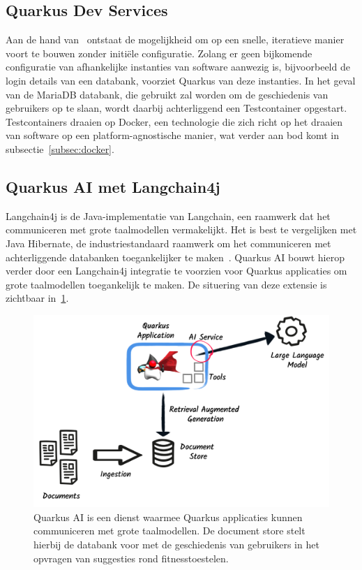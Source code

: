 \subsection{Quarkus Dev Services}
\label{subsec:quarkus-dev-services}
Aan de hand van~\autocite{Quarkus} ontstaat de mogelijkheid om op een snelle, iteratieve manier voort te bouwen zonder initiële configuratie.
Zolang er geen bijkomende configuratie van afhankelijke instanties van software aanwezig is, bijvoorbeeld de login details van een databank, voorziet Quarkus van deze instanties.
In het geval van de MariaDB databank, die gebruikt zal worden om de geschiedenis van gebruikers op te slaan, wordt daarbij achterliggend een Testcontainer opgestart.
Testcontainers draaien op Docker, een technologie die zich richt op het draaien van software op een platform-agnostische manier, wat verder aan bod komt in subsectie~\ref{subsec:docker}.

\subsection{Quarkus AI met Langchain4j}
\label{subsec:quarkus-ai-met-langchain4j}
Langchain4j is de Java-implementatie van Langchain, een raamwerk dat het communiceren met grote taalmodellen vermakelijkt.
Het is best te vergelijken met Java Hibernate, de industriestandaard raamwerk om het communiceren met achterliggende databanken toegankelijker te maken~\autocite{Langchain4j}.
Quarkus AI bouwt hierop verder door een Langchain4j integratie te voorzien voor Quarkus applicaties om grote taalmodellen toegankelijk te maken.
De situering van deze extensie is zichtbaar in~\ref{fig:quarkus-ai}.

\begin{figure}[H]
    \begin{center}
        \includegraphics[scale=0.45]{images/quarkus-ai-visualisation}
        \caption{Quarkus AI is een dienst waarmee Quarkus applicaties kunnen communiceren met grote taalmodellen. De document store stelt hierbij de databank voor met de geschiedenis van gebruikers in het opvragen van suggesties rond fitnesstoestelen.~\autocite{Lowe2004}}
        \label{fig:quarkus-ai}
    \end{center}
\end{figure}

